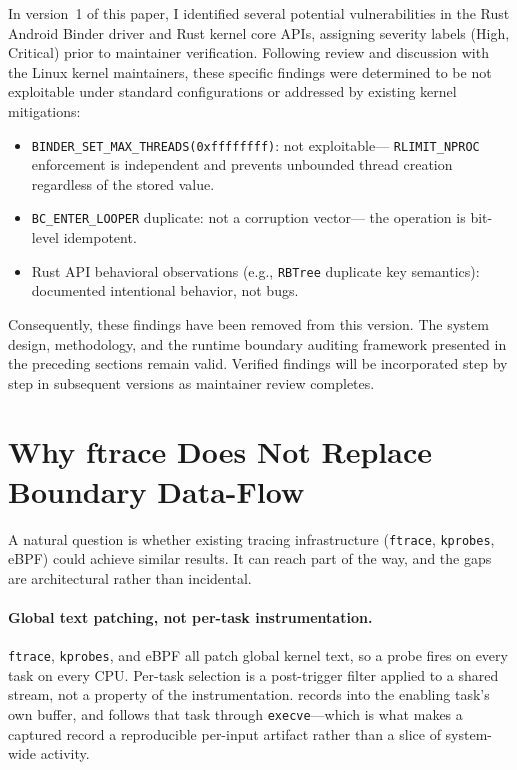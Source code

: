 \documentclass{article}
\begin{document}
In version~1 of this paper, I identified several potential vulnerabilities
in the Rust Android Binder driver and Rust kernel core APIs, assigning severity
labels (High, Critical) prior to maintainer verification. Following review
and discussion with the Linux kernel maintainers, these specific findings
were determined to be not exploitable under standard configurations or
addressed by existing kernel mitigations:

\begin{itemize}[nosep]
  \item \texttt{BINDER\_SET\_MAX\_THREADS(0xffffffff)}: not exploitable---
        \texttt{RLIMIT\_NPROC} enforcement is independent and prevents
        unbounded thread creation regardless of the stored value.
  \item \texttt{BC\_ENTER\_LOOPER} duplicate: not a corruption vector---
        the operation is bit-level idempotent.
  \item Rust API behavioral observations (e.g., \texttt{RBTree} duplicate
        key semantics): documented intentional behavior, not bugs.
\end{itemize}

\noindent Consequently, these findings have been removed from this version.
The system design, methodology, and the runtime boundary auditing framework
presented in the preceding sections remain valid. Verified findings will be
incorporated step by step in subsequent versions as maintainer review
completes.

\section{Why ftrace Does Not Replace Boundary Data-Flow}\label{sec:ftrace}

A natural question is whether existing tracing infrastructure (\texttt{ftrace},
\texttt{kprobes}, eBPF) could achieve similar results. It can reach part of the
way, and the gaps are architectural rather than incidental.

\paragraph{Global text patching, not per-task instrumentation.}
\texttt{ftrace}, \texttt{kprobes}, and eBPF all patch global kernel text, so a
probe fires on every task on every CPU. Per-task selection is a post-trigger
filter applied to a shared stream, not a property of the instrumentation.
\toolname{} records into the enabling task's own buffer, and follows that task
through \texttt{execve}---which is what makes a captured record a reproducible
per-input artifact rather than a slice of system-wide activity.
\end{document}
